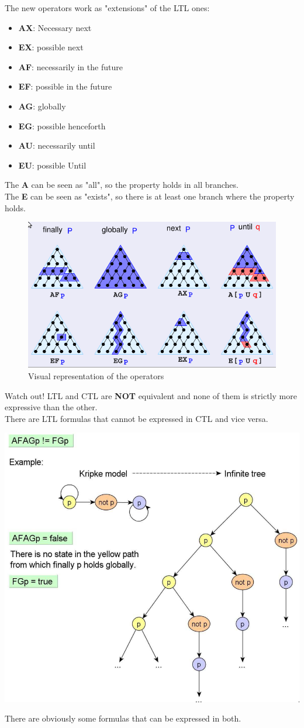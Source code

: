 \documentclass{article}
\begin{document}
The new operators work as "extensions" of the LTL ones:
\begin{itemize}
    \item \textbf{AX}: Necessary next
    \item \textbf{EX}: possible next
    \item \textbf{AF}: necessarily in the future
    \item \textbf{EF}: possible in the future
    \item \textbf{AG}: globally
    \item \textbf{EG}: possible henceforth
    \item \textbf{AU}: necessarily until
    \item \textbf{EU}: possible Until
\end{itemize} 
The \textbf{A} can be seen as "all", so the property holds in all branches.\\
The \textbf{E} can be seen as "exists", so there is at least one branch where the property holds.

\begin{figure}[ht]
    \centering
    \includegraphics[width=0.5\linewidth]{images/CTLtrees.png}
    \caption{Visual representation of the operators}
\end{figure}

\begin{callout}[red]{Watch out!}
    LTL and CTL are \textbf{NOT} equivalent and none of them is strictly more expressive than the other.\\
    There are LTL formulas that cannot be expressed in CTL and vice versa.
    \begin{center}
        \includegraphics[width=0.5\linewidth]{images/AFAGvsFG.png}
    \end{center}
    There are obviously some formulas that can be expressed in both.
\end{callout}
\end{document}

